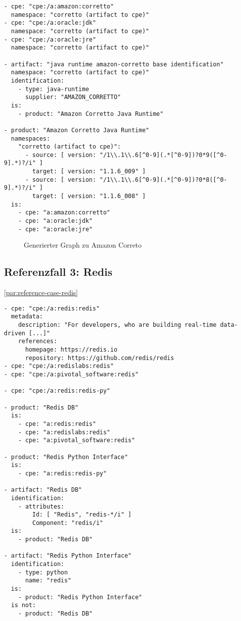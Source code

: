 \begin{lstlisting}[style=yaml,caption={Produktmodellierung zu Amazon Correto},label={lst:new-correlation-java-runtimes},basicstyle=\ttfamily\scriptsize]
- cpe: "cpe:/a:amazon:corretto"
  namespace: "corretto (artifact to cpe)"
- cpe: "cpe:/a:oracle:jdk"
  namespace: "corretto (artifact to cpe)"
- cpe: "cpe:/a:oracle:jre"
  namespace: "corretto (artifact to cpe)"

- artifact: "java runtime amazon-corretto base identification"
  namespace: "corretto (artifact to cpe)"
  identification:
    - type: java-runtime
      supplier: "AMAZON_CORRETTO"
  is:
    - product: "Amazon Corretto Java Runtime"

- product: "Amazon Corretto Java Runtime"
  namespaces:
    "corretto (artifact to cpe)":
      - source: [ version: "/1\\.1\\.6[^0-9](.*[^0-9])?0*9([^0-9].*)?/i" ]
        target: [ version: "1.1.6_009" ]
      - source: [ version: "/1\\.1\\.6[^0-9](.*[^0-9])?0*8([^0-9].*)?/i" ]
        target: [ version: "1.1.6_008" ]
  is:
    - cpe: "a:amazon:corretto"
    - cpe: "a:oracle:jdk"
    - cpe: "a:oracle:jre"
\end{lstlisting}

\begin{figure}[htbp]
    \centering
    \makebox[\textwidth]{}
    \caption{Generierter Graph zu Amazon Correto}
    \label{fig:example-graph-java-runtimes}
\end{figure}

\subsection{Referenzfall 3: Redis}\label{subsec:example-redis}
\autoref{par:reference-case-redis}

\begin{lstlisting}[style=yaml,caption={Produktmodellierung zu Redis},label={lst:new-correlation-redis},basicstyle=\ttfamily\scriptsize]
- cpe: "cpe:/a:redis:redis"
  metadata:
    description: "For developers, who are building real-time data-driven [...]"
    references:
      homepage: https://redis.io
      repository: https://github.com/redis/redis
- cpe: "cpe:/a:redislabs:redis"
- cpe: "cpe:/a:pivotal_software:redis"

- cpe: "cpe:/a:redis:redis-py"

- product: "Redis DB"
  is:
    - cpe: "a:redis:redis"
    - cpe: "a:redislabs:redis"
    - cpe: "a:pivotal_software:redis"

- product: "Redis Python Interface"
  is:
    - cpe: "a:redis:redis-py"

- artifact: "Redis DB"
  identification:
    - attributes:
        Id: [ "Redis", "redis-*/i" ]
        Component: "redis/i"
  is:
    - product: "Redis DB"

- artifact: "Redis Python Interface"
  identification:
    - type: python
      name: "redis"
  is:
    - product: "Redis Python Interface"
  is not:
    - product: "Redis DB"
\end{lstlisting}

